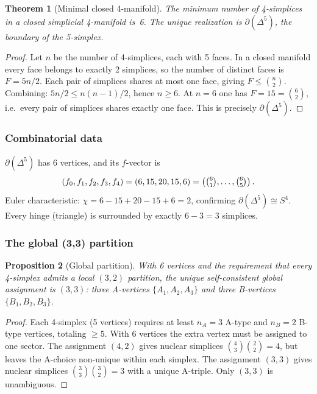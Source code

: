 \documentclass[12pt]{article}
\newtheorem{theorem}{Theorem}[section]
\newtheorem{proposition}[theorem]{Proposition}
\theoremstyle{remark}
\theoremstyle{definition}
\begin{document}
\begin{theorem}[Minimal closed 4-manifold]
\label{thm:minimal_closed}
The minimum number of 4-simplices in a closed simplicial 4-manifold is~6.  The unique realization is $\partial(\Delta^5)$, the boundary of the 5-simplex.
\end{theorem}

\begin{proof}
Let $n$ be the number of 4-simplices, each with 5 faces.  In a closed manifold every face belongs to exactly 2 simplices, so the number of distinct faces is $F = 5n/2$.  Each pair of simplices shares at most one face, giving $F \leq \binom{n}{2}$.  Combining: $5n/2 \leq n(n{-}1)/2$, hence $n \geq 6$.  At $n = 6$ one has $F = 15 = \binom{6}{2}$, i.e.\ every pair of simplices shares exactly one face.  This is precisely $\partial(\Delta^5)$.
\end{proof}

\subsubsection{Combinatorial data}

$\partial(\Delta^5)$ has 6 vertices, and its $f$-vector is
\begin{equation}
(f_0, f_1, f_2, f_3, f_4) = (6, 15, 20, 15, 6) = \left(\tbinom{6}{1},\ldots,\tbinom{6}{5}\right).
\end{equation}
Euler characteristic: $\chi = 6 - 15 + 20 - 15 + 6 = 2$, confirming $\partial(\Delta^5) \cong S^4$.  Every hinge (triangle) is surrounded by exactly $6 - 3 = 3$ simplices.

\subsubsection{The global (3,3) partition}

\begin{proposition}[Global partition]
\label{prop:33_partition}
With 6 vertices and the requirement that every 4-simplex admits a local $(3,2)$ partition, the unique self-consistent global assignment is $(3,3)$: three A-vertices $\{A_1, A_2, A_3\}$ and three B-vertices $\{B_1, B_2, B_3\}$.
\end{proposition}

\begin{proof}
Each 4-simplex (5 vertices) requires at least $n_A = 3$ A-type and $n_B = 2$ B-type vertices, totaling $\geq 5$.  With 6 vertices the extra vertex must be assigned to one sector.  The assignment $(4, 2)$ gives nuclear simplices $\binom{4}{3}\binom{2}{2} = 4$, but leaves the A-choice non-unique within each simplex.  The assignment $(3, 3)$ gives nuclear simplices $\binom{3}{3}\binom{3}{2} = 3$ with a unique A-triple.  Only $(3, 3)$ is unambiguous.
\end{proof}
\end{document}

